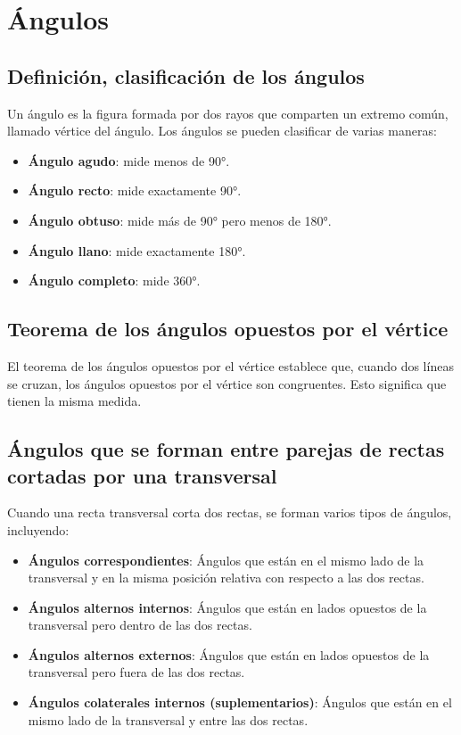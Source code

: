 \section{Ángulos} %

\subsection{Definición, clasificación de los ángulos}
Un ángulo es la figura formada por dos rayos que comparten un extremo común, llamado vértice del ángulo. Los ángulos se pueden clasificar de varias maneras:
\begin{itemize}
    \item \textbf{Ángulo agudo}: mide menos de 90°.
    \item \textbf{Ángulo recto}: mide exactamente 90°.
    \item \textbf{Ángulo obtuso}: mide más de 90° pero menos de 180°.
    \item \textbf{Ángulo llano}: mide exactamente 180°.
    \item \textbf{Ángulo completo}: mide 360°.
\end{itemize}

\subsection{Teorema de los ángulos opuestos por el vértice}
El teorema de los ángulos opuestos por el vértice establece que, cuando dos líneas se cruzan, los ángulos opuestos por el vértice son congruentes. Esto significa que tienen la misma medida.

\subsection{Ángulos que se forman entre parejas de rectas cortadas por una transversal}
Cuando una recta transversal corta dos rectas, se forman varios tipos de ángulos, incluyendo:
\begin{itemize}
    \item \textbf{Ángulos correspondientes}: Ángulos que están en el mismo lado de la transversal y en la misma posición relativa con respecto a las dos rectas.
    \item \textbf{Ángulos alternos internos}: Ángulos que están en lados opuestos de la transversal pero dentro de las dos rectas.
    \item \textbf{Ángulos alternos externos}: Ángulos que están en lados opuestos de la transversal pero fuera de las dos rectas.
    \item \textbf{Ángulos colaterales internos (suplementarios)}: Ángulos que están en el mismo lado de la transversal y entre las dos rectas.
\end{itemize}

